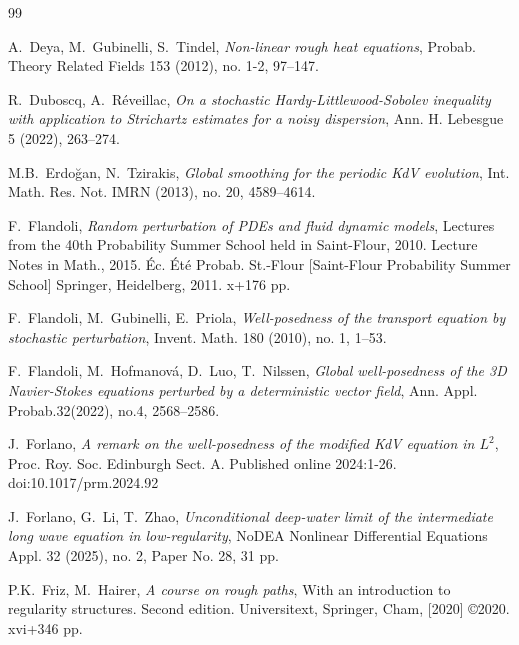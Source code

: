 \documentclass[letterpaper, 11pt,  reqno]{amsart}
\newcommand{\1}{\hspace{0.5mm}\text{I}\hspace{0.5mm}}
\numberwithin{equation}{section}
\numberwithin{theorem}{section}
\begin{document}
\begin{thebibliography}{99}
 
 
A.~Deya, M.~Gubinelli, S.~Tindel,
{\it Non-linear rough heat equations},
Probab. Theory Related Fields 153 (2012), no. 1-2, 97--147.
 
 

R.~Duboscq, A.~R\'eveillac, 
{\it On a stochastic Hardy-Littlewood-Sobolev inequality with application to Strichartz estimates for a noisy dispersion}, 
Ann. H. Lebesgue 5 (2022), 263--274. 


M.B.~Erdo\u{g}an, N.~Tzirakis, 
{\it Global smoothing for the periodic KdV evolution}, 
Int. Math. Res. Not. IMRN (2013), no. 20, 4589--4614.



F.~Flandoli, 
{\it Random perturbation of PDEs and fluid dynamic models},
 Lectures from the 40th Probability Summer School held in Saint-Flour, 2010. Lecture Notes in Math., 2015. 
 \'Ec. \'Et\'e Probab. St.-Flour [Saint-Flour Probability Summer School] Springer, Heidelberg, 2011. x+176 pp.




F.~Flandoli, M.~Gubinelli, E.~Priola,
{\it Well-posedness of the transport equation by stochastic perturbation},
Invent. Math. 180 (2010), no. 1, 1--53.


F.~Flandoli, M.~Hofmanov\'a, D.~Luo, T.~Nilssen, 
{\it Global well-posedness of the 3D Navier-Stokes equations perturbed by a deterministic vector field}, 
Ann. Appl. Probab.32(2022), no.4, 2568--2586.


J.~Forlano,
{\it A remark on the well-posedness of the modified KdV equation in $L^2$},
Proc. Roy. Soc. Edinburgh Sect. A. Published online 2024:1-26. doi:10.1017/prm.2024.92



J.~Forlano, G.~Li, T.~Zhao,
{\it Unconditional deep-water limit of the intermediate long wave equation in low-regularity},
 NoDEA Nonlinear Differential Equations Appl. 32 (2025), no. 2, Paper No. 28, 31 pp.





P.K.~Friz,  M.~Hairer, 
{\it A course on rough paths}, 
With an introduction to regularity structures. Second edition.
Universitext, Springer, Cham, [2020] \copyright 2020. xvi+346 pp.



%
%


\end{thebibliography}
\end{document}
